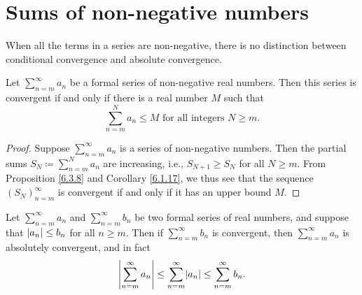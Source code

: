 \section{Sums of non-negative numbers}\label{sec 7.3}

\begin{note}
    When all the terms in a series are non-negative, there is no distinction between conditional convergence and absolute convergence.
\end{note}

\begin{proposition}\label{7.3.1}
    Let \(\sum_{n = m}^\infty a_n\) be a formal series of non-negative real numbers.
    Then this series is convergent if and only if there is a real number \(M\) such that
    \[
        \sum_{n = m}^N a_n \leq M \text{ for all integers } N \geq m.
    \]
\end{proposition}

\begin{proof}
    Suppose \(\sum_{n = m}^\infty a_n\) is a series of non-negative numbers.
    Then the partial sums \(S_N \coloneqq \sum_{n = m}^N a_n\) are increasing, i.e., \(S_{N + 1} \geq S_N\) for all \(N \geq m\).
    From Proposition \ref{6.3.8} and Corollary \ref{6.1.17}, we thus see that the sequence \((S_N)_{n = m}^\infty\) is convergent if and only if it has an upper bound \(M\).
\end{proof}

\begin{corollary}\label{7.3.2}
    Let \(\sum_{n = m}^\infty a_n\) and \(\sum_{n = m}^\infty b_n\) be two formal series of real numbers, and suppose that \(\abs*{a_n} \leq b_n\) for all \(n \geq m\).
    Then if \(\sum_{n = m}^\infty b_n\) is convergent, then \(\sum_{n = m}^\infty a_n\) is absolutely convergent, and in fact
    \[
        \abs*{\sum_{n = m}^\infty a_n} \leq \sum_{n = m}^\infty \abs*{a_n} \leq \sum_{n = m}^\infty b_n.
    \]
\end{corollary}

